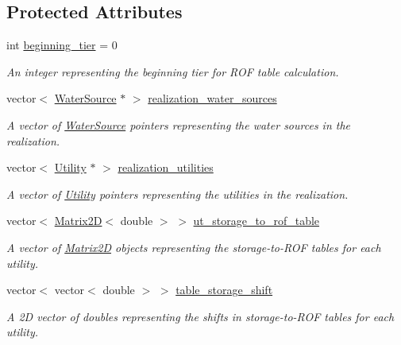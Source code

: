 \subsection*{Protected Attributes}
\begin{DoxyCompactItemize}
\item 
int \mbox{\hyperlink{classContinuityModelROF_ad0a8c47eca4ca66b58a2636ab907a4f2}{beginning\+\_\+tier}} = 0
\begin{DoxyCompactList}\small\item\em An integer representing the beginning tier for R\+OF table calculation. \end{DoxyCompactList}\item 
vector$<$ \mbox{\hyperlink{classWaterSource}{Water\+Source}} $\ast$ $>$ \mbox{\hyperlink{classContinuityModelROF_a77048d247b8d1f70fbdd31559b4d3337}{realization\+\_\+water\+\_\+sources}}
\begin{DoxyCompactList}\small\item\em A vector of {\ttfamily \mbox{\hyperlink{classWaterSource}{Water\+Source}}} pointers representing the water sources in the realization. \end{DoxyCompactList}\item 
vector$<$ \mbox{\hyperlink{classUtility}{Utility}} $\ast$ $>$ \mbox{\hyperlink{classContinuityModelROF_a75c6823d8dd37f274ee91ce158088dc4}{realization\+\_\+utilities}}
\begin{DoxyCompactList}\small\item\em A vector of {\ttfamily \mbox{\hyperlink{classUtility}{Utility}}} pointers representing the utilities in the realization. \end{DoxyCompactList}\item 
vector$<$ \mbox{\hyperlink{classMatrix2D}{Matrix2D}}$<$ double $>$ $>$ \mbox{\hyperlink{classContinuityModelROF_ada25d241caf860255ad00097f5e7adb6}{ut\+\_\+storage\+\_\+to\+\_\+rof\+\_\+table}}
\begin{DoxyCompactList}\small\item\em A vector of {\ttfamily \mbox{\hyperlink{classMatrix2D}{Matrix2D}}} objects representing the storage-\/to-\/\+R\+OF tables for each utility. \end{DoxyCompactList}\item 
vector$<$ vector$<$ double $>$ $>$ \mbox{\hyperlink{classContinuityModelROF_a1a90c8816944aab36f395e89f7b84c06}{table\+\_\+storage\+\_\+shift}}
\begin{DoxyCompactList}\small\item\em A 2D vector of doubles representing the shifts in storage-\/to-\/\+R\+OF tables for each utility. \end{DoxyCompactList}\item 

\end{DoxyCompactItemize}
